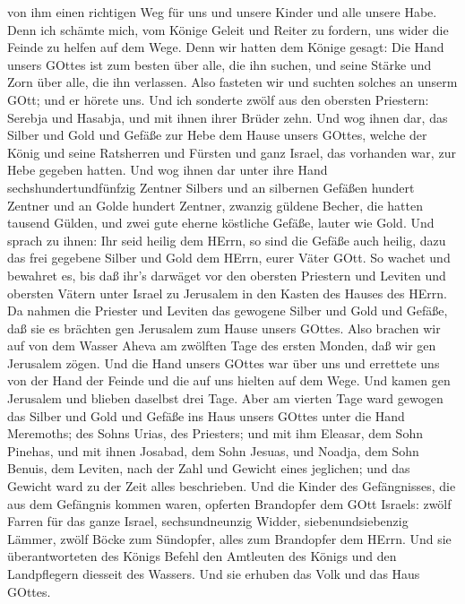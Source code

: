 von ihm einen richtigen Weg für uns und unsere Kinder und alle unsere
Habe.  Denn ich schämte mich, vom Könige Geleit und Reiter
zu fordern, uns wider die Feinde zu helfen auf dem Wege. Denn wir hatten
dem Könige gesagt: Die Hand unsers GOttes ist zum besten über alle, die
ihn suchen, und seine Stärke und Zorn über alle, die ihn verlassen.
 Also fasteten wir und suchten solches an unserm GOtt; und
er hörete uns.  Und ich sonderte zwölf aus den obersten
Priestern: Serebja und Hasabja, und mit ihnen ihrer Brüder zehn.
 Und wog ihnen dar, das Silber und Gold und Gefäße zur Hebe
dem Hause unsers GOttes, welche der König und seine Ratsherren und
Fürsten und ganz Israel, das vorhanden war, zur Hebe gegeben hatten.
 Und wog ihnen dar unter ihre Hand sechshundertundfünfzig
Zentner Silbers und an silbernen Gefäßen hundert Zentner und an Golde
hundert Zentner,  zwanzig güldene Becher, die hatten
tausend Gülden, und zwei gute eherne köstliche Gefäße, lauter wie Gold.
 Und sprach zu ihnen: Ihr seid heilig dem HErrn, so sind
die Gefäße auch heilig, dazu das frei gegebene Silber und Gold dem
HErrn, eurer Väter GOtt.  So wachet und bewahret es, bis
daß ihr's darwäget vor den obersten Priestern und Leviten und obersten
Vätern unter Israel zu Jerusalem in den Kasten des Hauses des HErrn.
 Da nahmen die Priester und Leviten das gewogene Silber und
Gold und Gefäße, daß sie es brächten gen Jerusalem zum Hause unsers
GOttes.  Also brachen wir auf von dem Wasser Aheva am
zwölften Tage des ersten Monden, daß wir gen Jerusalem zögen. Und die
Hand unsers GOttes war über uns und errettete uns von der Hand der
Feinde und die auf uns hielten auf dem Wege.  Und kamen gen
Jerusalem und blieben daselbst drei Tage.  Aber am vierten
Tage ward gewogen das Silber und Gold und Gefäße ins Haus unsers GOttes
unter die Hand Meremoths; des Sohns Urias, des Priesters; und mit ihm
Eleasar, dem Sohn Pinehas, und mit ihnen Josabad, dem Sohn Jesuas, und
Noadja, dem Sohn Benuis, dem Leviten,  nach der Zahl und
Gewicht eines jeglichen; und das Gewicht ward zu der Zeit alles
beschrieben.  Und die Kinder des Gefängnisses, die aus dem
Gefängnis kommen waren, opferten Brandopfer dem GOtt Israels: zwölf
Farren für das ganze Israel, sechsundneunzig Widder, siebenundsiebenzig
Lämmer, zwölf Böcke zum Sündopfer, alles zum Brandopfer dem HErrn.
 Und sie überantworteten des Königs Befehl den Amtleuten
des Königs und den Landpflegern diesseit des Wassers. Und sie erhuben
das Volk und das Haus GOttes.

